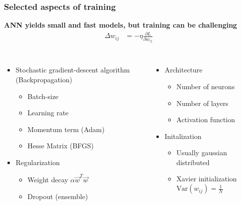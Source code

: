 \begin{frame}
    \frametitle{Selected aspects of training}
    \begin{center}
      \textbf{ANN yields small and fast models, but training can be challenging}
      \begin{align*}
        \Delta w_{ij} &= - \eta \frac{\partial L}{\partial w_{ij}}
      \end{align*}

      \begin{columns}
        \begin{itemize}
          \item Stochastic gradient-descent algorithm (Backpropagation)
            \begin{itemize}
              \item Batch-size
              \item Learning rate
              \item Momentum term (Adam)
              \item Hesse Matrix (BFGS)
            \end{itemize}
          \item Regularization
            \begin{itemize}
              \item Weight decay $\alpha \vec{w}^T \vec{w}$
              \item Dropout (ensemble)
            \end{itemize}
        \end{itemize}
        \begin{itemize}
          \item Architecture
            \begin{itemize}
              \item Number of neurons
              \item Number of layers
              \item Activation function
            \end{itemize}
          \item Initalization
            \begin{itemize}
              \item Usually gaussian distributed
              \item Xavier initialization $\mathrm{Var}(w_{ij}) = \frac{1}{N}$
            \end{itemize}
        \end{itemize}
      \end{columns}
    \end{center}
\end{frame}

